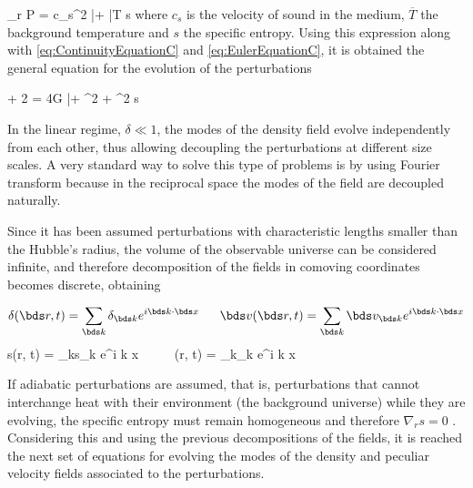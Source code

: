 { \nabla_r P = c_s^2 \bar \rho \nabla \delta + 
\bar T \rho \nabla s }
where $c_s$ is the velocity of sound in the medium, $\overline T$ the 
background temperature and $s$ the specific entropy. Using this expression
along with \ref{eq:ContinuityEquationC} and \ref{eq:EulerEquationC}, it is
obtained the general equation for the evolution of the perturbations



{  + 2  = 
4\pi G \bar \rho \delta + \nabla^2 \delta +
\nabla^2 s }


In the linear regime, $\delta \ll 1$, the modes of the density field 
evolve independently from each other, thus allowing decoupling the 
perturbations at different size scales. A very standard way to solve this 
type of problems is by using Fourier transform because in the reciprocal 
space the modes of the field are decoupled naturally.


Since it has been assumed perturbations with characteristic lengths 
smaller than the Hubble's radius, the volume of the observable universe 
can be considered infinite, and therefore decomposition of the fields 
in comoving coordinates becomes discrete, obtaining

 

\[  \delta(\bds r, t) =  \sum_{\bds k}\delta_{\bds k} e^{i \bds k \cdot \bds x} 
\ \ \ \ \ 
	\bds v(\bds r, t) =  \sum_{\bds k}\bds v_{\bds k} e^{i \bds k \cdot \bds x}\]
\eq{eq:FourierFields}
{  s(\bds r, t) =  \sum_{\bds k}s_{\bds k} e^{i \bds k \cdot \bds x} 
\ \ \ \ \ 
	\Phi(\bds r, t) =  \sum_{\bds k}\Phi_{\bds k} e^{i \bds k \cdot \bds x}}


If adiabatic perturbations are assumed, that is, perturbations that 
cannot interchange heat with their environment (the background universe) 
while they are evolving, the specific entropy must remain homogeneous and
therefore $\nabla_r s = 0$ \cite{longair2008}. Considering this and using
the previous decompositions of the fields, it is reached the next set of 
equations for evolving the modes of the density and peculiar velocity 
fields associated to the perturbations.




